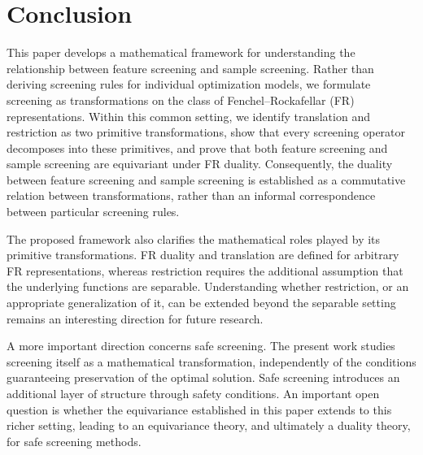 \section*{Conclusion}

This paper develops a mathematical framework for understanding the
relationship between feature screening and sample screening. Rather than
deriving screening rules for individual optimization models, we formulate
screening as transformations on the class of Fenchel--Rockafellar (FR)
representations. Within this common setting, we identify translation and
restriction as two primitive transformations, show that every screening
operator decomposes into these primitives, and prove that both feature
screening and sample screening are equivariant under FR duality.
Consequently, the duality between feature screening and sample screening
is established as a commutative relation between transformations, rather
than an informal correspondence between particular screening rules.

The proposed framework also clarifies the mathematical roles played by
its primitive transformations. FR duality and translation are defined
for arbitrary FR representations, whereas restriction requires the
additional assumption that the underlying functions are separable.
Understanding whether restriction, or an appropriate generalization of
it, can be extended beyond the separable setting remains an interesting
direction for future research.

A more important direction concerns safe screening. The present work
studies screening itself as a mathematical transformation, independently
of the conditions guaranteeing preservation of the optimal solution.
Safe screening introduces an additional layer of structure through
safety conditions. An important open question is whether the
equivariance established in this paper extends to this richer setting,
leading to an equivariance theory, and ultimately a duality theory, for
safe screening methods.